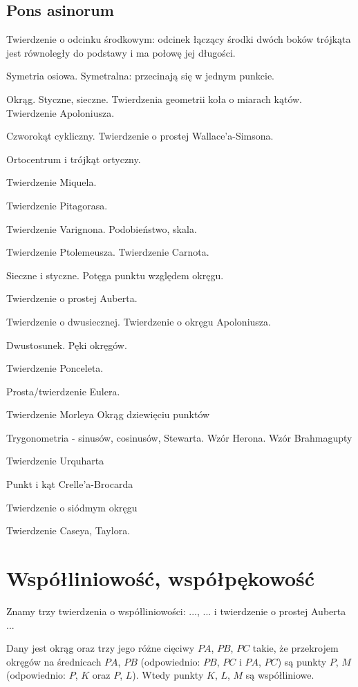 \documentclass{parchment}
\begin{document}
\section{Pons asinorum}

Twierdzenie o odcinku środkowym: odcinek łączący środki dwóch boków trójkąta jest równoległy do podstawy i ma połowę jej długości.

Symetria osiowa.
Symetralna: przecinają się w jednym punkcie.

Okrąg.
Styczne, sieczne.
Twierdzenia geometrii koła o miarach kątów.
Twierdzenie Apoloniusza.

Czworokąt cykliczny.
Twierdzenie o prostej Wallace'a-Simsona.

Ortocentrum i trójkąt ortyczny.

Twierdzenie Miquela.

Twierdzenie Pitagorasa.



Twierdzenie Varignona.
Podobieństwo, skala.

Twierdzenie Ptolemeusza.
Twierdzenie Carnota.

Sieczne i styczne.
Potęga punktu względem okręgu.

Twierdzenie o prostej Auberta.

Twierdzenie o dwusiecznej.
Twierdzenie o okręgu Apoloniusza.

Dwustosunek.
Pęki okręgów.

Twierdzenie Ponceleta.

Prosta/twierdzenie Eulera.

Twierdzenie Morleya
Okrąg dziewięciu punktów

Trygonometria - sinusów, cosinusów, Stewarta.
Wzór Herona.
Wzór Brahmagupty

Twierdzenie Urquharta

Punkt i kąt Crelle'a-Brocarda

Twierdzenie o siódmym okręgu

Twierdzenie Caseya, Taylora.

\chapter{Współliniowość, współpękowość}

Znamy trzy twierdzenia o współliniowości: ..., ... i twierdzenie o prostej Auberta ...

\begin{proposition}
	Dany jest okrąg oraz trzy jego różne cięciwy $PA$, $PB$, $PC$ takie, że przekrojem okręgów na średnicach $PA$, $PB$ (odpowiednio: $PB$, $PC$ i $PA$, $PC$) są punkty $P$, $M$ (odpowiednio: $P$, $K$ oraz $P$, $L$).
	Wtedy punkty $K$, $L$, $M$ są współliniowe.
\end{proposition}
\end{document}
